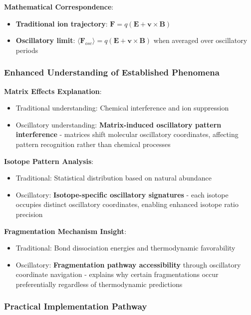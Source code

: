\documentclass[11pt,a4paper]{article}
\theoremstyle{remark}
\begin{document}
\textbf{Mathematical Correspondence}:
\begin{itemize}
\item \textbf{Traditional ion trajectory}: $\mathbf{F} = q(\mathbf{E} + \mathbf{v} \times \mathbf{B})$
\item \textbf{Oscillatory limit}: $\langle\mathbf{F}_{osc}\rangle = q(\mathbf{E} + \mathbf{v} \times \mathbf{B})$ when averaged over oscillatory periods
\end{itemize}

\subsubsection{Enhanced Understanding of Established Phenomena}

\textbf{Matrix Effects Explanation}:
\begin{itemize}
\item Traditional understanding: Chemical interference and ion suppression
\item Oscillatory understanding: \textbf{Matrix-induced oscillatory pattern interference} - matrices shift molecular oscillatory coordinates, affecting pattern recognition rather than chemical processes
\end{itemize}

\textbf{Isotope Pattern Analysis}:
\begin{itemize}
\item Traditional: Statistical distribution based on natural abundance
\item Oscillatory: \textbf{Isotope-specific oscillatory signatures} - each isotope occupies distinct oscillatory coordinates, enabling enhanced isotope ratio precision
\end{itemize}

\textbf{Fragmentation Mechanism Insight}:
\begin{itemize}
\item Traditional: Bond dissociation energies and thermodynamic favorability  
\item Oscillatory: \textbf{Fragmentation pathway accessibility} through oscillatory coordinate navigation - explains why certain fragmentations occur preferentially regardless of thermodynamic predictions
\end{itemize}

\subsubsection{Practical Implementation Pathway}
\end{document}
